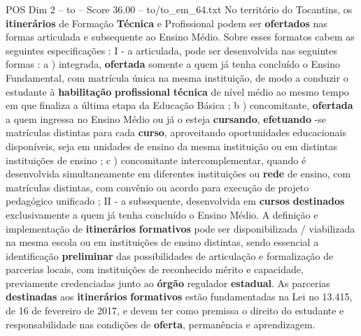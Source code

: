 \begin{textsample}{POS Dim 2 – to – Score 36.00 – to/to\_em\_64.txt}
No território do Tocantins, os \textbf{itinerários} de Formação \textbf{Técnica} e Profissional podem ser \textbf{ofertados} nas formas articulada e subsequente ao Ensino Médio.
Sobre esses formatos cabem as seguintes especificações : I - a articulada, pode ser desenvolvida nas seguintes formas : a ) integrada, \textbf{ofertada} somente a quem já tenha concluído o Ensino Fundamental, com matrícula única na mesma instituição, de modo a conduzir o estudante à \textbf{habilitação} \textbf{profissional} \textbf{técnica} de nível médio ao mesmo tempo em que finaliza a última etapa da Educação Básica ; b ) concomitante, \textbf{ofertada} a quem ingressa no Ensino Médio ou já o esteja \textbf{cursando}, \textbf{efetuando} -se matrículas distintas para cada \textbf{curso}, aproveitando oportunidades educacionais disponíveis, seja em unidades de ensino da mesma instituição ou em distintas instituições de ensino ; c ) concomitante intercomplementar, quando é desenvolvida simultaneamente em diferentes instituições ou \textbf{rede} de ensino, com matrículas distintas, com convênio ou acordo para execução de projeto pedagógico unificado ; II - a subsequente, desenvolvida em \textbf{cursos} \textbf{destinados} exclusivamente a quem já tenha concluído o Ensino Médio.
A definição e implementação de \textbf{itinerários} \textbf{formativos} pode ser disponibilizada / viabilizada na mesma escola ou em instituições de ensino distintas, sendo essencial a identificação \textbf{preliminar} das possibilidades de articulação e formalização de parcerias locais, com instituições de reconhecido mérito e capacidade, previamente credenciadas junto ao \textbf{órgão} regulador \textbf{estadual}.
As parcerias \textbf{destinadas} aos \textbf{itinerários} \textbf{formativos} estão fundamentadas na Lei no 13.415, de 16 de fevereiro de 2017, e devem ter como premissa o direito do estudante e responsabilidade nas condições de \textbf{oferta}, permanência e aprendizagem.

\end{textsample}
